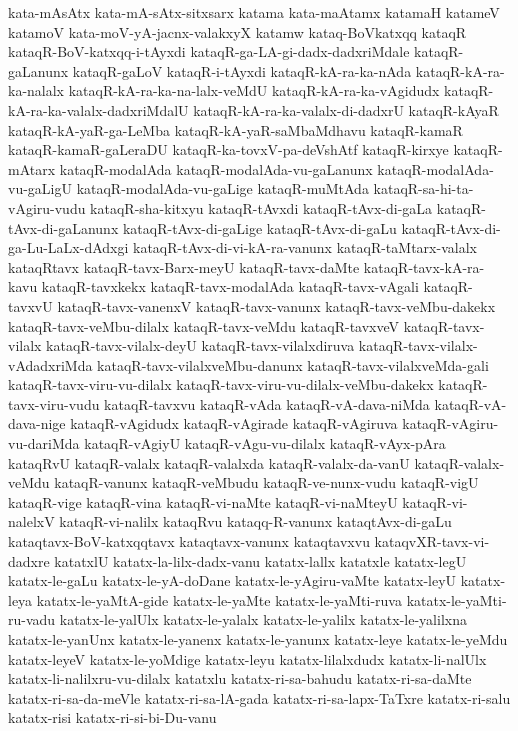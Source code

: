 {kata-mAsAtx
kata-mA-sAtx-sitxsarx
katama
kata-maAtamx
katamaH
katameV
katamoV
kata-moV-yA-jacnx-valakxyX
katamw
kataq-BoVkatxqq
kataqR
kataqR-BoV-katxqq-i-tAyxdi
kataqR-ga-LA-gi-dadx-dadxriMdale
kataqR-gaLanunx
kataqR-gaLoV
kataqR-i-tAyxdi
kataqR-kA-ra-ka-nAda
kataqR-kA-ra-ka-nalalx
kataqR-kA-ra-ka-na-lalx-veMdU
kataqR-kA-ra-ka-vAgidudx
kataqR-kA-ra-ka-valalx-dadxriMdalU
kataqR-kA-ra-ka-valalx-di-dadxrU
kataqR-kAyaR
kataqR-kA-yaR-ga-LeMba
kataqR-kA-yaR-saMbaMdhavu
kataqR-kamaR
kataqR-kamaR-gaLeraDU
kataqR-ka-tovxV-pa-deVshAtf
kataqR-kirxye
kataqR-mAtarx
kataqR-modalAda
kataqR-modalAda-vu-gaLanunx
kataqR-modalAda-vu-gaLigU
kataqR-modalAda-vu-gaLige
kataqR-muMtAda
kataqR-sa-hi-ta-vAgiru-vudu
kataqR-sha-kitxyu
kataqR-tAvxdi
kataqR-tAvx-di-gaLa
kataqR-tAvx-di-gaLanunx
kataqR-tAvx-di-gaLige
kataqR-tAvx-di-gaLu
kataqR-tAvx-di-ga-Lu-LaLx-dAdxgi
kataqR-tAvx-di-vi-kA-ra-vanunx
kataqR-taMtarx-valalx
kataqRtavx
kataqR-tavx-Barx-meyU
kataqR-tavx-daMte
kataqR-tavx-kA-ra-kavu
kataqR-tavxkekx
kataqR-tavx-modalAda
kataqR-tavx-vAgali
kataqR-tavxvU
kataqR-tavx-vanenxV
kataqR-tavx-vanunx
kataqR-tavx-veMbu-dakekx
kataqR-tavx-veMbu-dilalx
kataqR-tavx-veMdu
kataqR-tavxveV
kataqR-tavx-vilalx
kataqR-tavx-vilalx-deyU
kataqR-tavx-vilalxdiruva
kataqR-tavx-vilalx-vAdadxriMda
kataqR-tavx-vilalxveMbu-danunx
kataqR-tavx-vilalxveMda-gali
kataqR-tavx-viru-vu-dilalx
kataqR-tavx-viru-vu-dilalx-veMbu-dakekx
kataqR-tavx-viru-vudu
kataqR-tavxvu
kataqR-vAda
kataqR-vA-dava-niMda
kataqR-vA-dava-nige
kataqR-vAgidudx
kataqR-vAgirade
kataqR-vAgiruva
kataqR-vAgiru-vu-dariMda
kataqR-vAgiyU
kataqR-vAgu-vu-dilalx
kataqR-vAyx-pAra
kataqRvU
kataqR-valalx
kataqR-valalxda
kataqR-valalx-da-vanU
kataqR-valalx-veMdu
kataqR-vanunx
kataqR-veMbudu
kataqR-ve-nunx-vudu
kataqR-vigU
kataqR-vige
kataqR-vina
kataqR-vi-naMte
kataqR-vi-naMteyU
kataqR-vi-nalelxV
kataqR-vi-nalilx
kataqRvu
kataqq-R-vanunx
kataqtAvx-di-gaLu
kataqtavx-BoV-katxqqtavx
kataqtavx-vanunx
kataqtavxvu
kataqvXR-tavx-vi-dadxre
katatxlU
katatx-la-lilx-dadx-vanu
katatx-lallx
katatxle
katatx-legU
katatx-le-gaLu
katatx-le-yA-doDane
katatx-le-yAgiru-vaMte
katatx-leyU
katatx-leya
katatx-le-yaMtA-gide
katatx-le-yaMte
katatx-le-yaMti-ruva
katatx-le-yaMti-ru-vadu
katatx-le-yalUlx
katatx-le-yalalx
katatx-le-yalilx
katatx-le-yalilxna
katatx-le-yanUnx
katatx-le-yanenx
katatx-le-yanunx
katatx-leye
katatx-le-yeMdu
katatx-leyeV
katatx-le-yoMdige
katatx-leyu
katatx-lilalxdudx
katatx-li-nalUlx
katatx-li-nalilxru-vu-dilalx
katatxlu
katatx-ri-sa-bahudu
katatx-ri-sa-daMte
katatx-ri-sa-da-meVle
katatx-ri-sa-lA-gada
katatx-ri-sa-lapx-TaTxre
katatx-ri-salu
katatx-risi
katatx-ri-si-bi-Du-vanu
}
